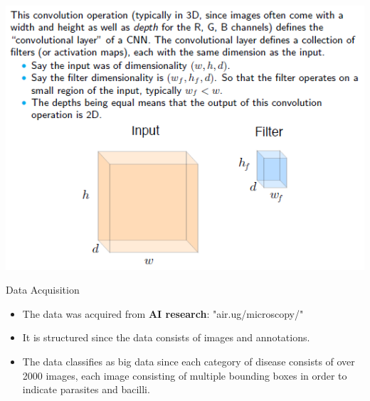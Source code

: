 \documentclass{beamer}
\begin{document}
\begin{frame}
	\begin{block}{\color{red}{Convolutional Layer}}
		\includegraphics[scale = 0.7]{cnn_math3.png}
	\end{block}
\end{frame}

\begin{frame}[t]{Data Acquisition}
	\begin{block}{\color{red}{Data Sources}}\vspace{5pt}\small
		\begin{itemize}

		\item The data was acquired from \textbf{AI research}: "air.ug/microscopy/" 
		
		\item It is structured since the data consists of images and annotations.
		
		\item The data classifies as big data since each category of disease consists of over 2000 images, each image consisting of multiple bounding boxes in order to indicate parasites and bacilli.
		
	\end{itemize}
	\end{block}
\end{frame}
\end{document}
